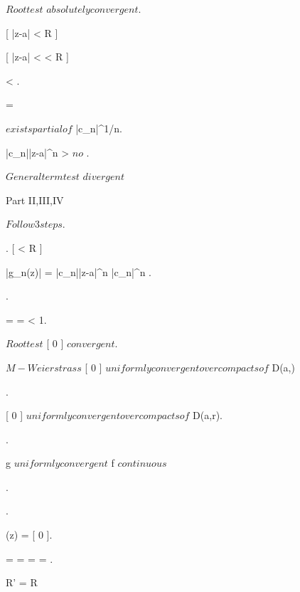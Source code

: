 \documentclass[../Main/main]{subfiles}
\begin{document}
{{{{			 	$ Root test $ \imp $ absolutely convergent $.

			 }

			 [ |z-a| < R ]
			 {
			 	\all{ \rho \in \R }[ |z-a| < \rho < R ]
			 	{
			 		 < .

			 		 =  \imp

			 		$ exists partial of $ |c_n|^{1/n}.

			 		|c_n||z-a|^n >  $ no $ .

			 		$ General term test $ \imp $ divergent $
			 	}
			}
		}
		
	}


	{
		{
			
		}
		\holds
		{
			Part II,III,IV
		}
		\demonstration
		{
			$ Follow 3 steps $.
			
			{
				.
				\all{ \rho \in \R }[ \rho < R ]
				{
					\all{ z \in \closed{D(a,\rho)} }
					{
						|g_n(z)| = |c_n||z-a|^n \leq |c_n|\rho^n
					}.

					.

					 = \rho {} =  < 1.

					$Root test$ \imp {}[ 0 ] $ convergent $.

					$M-Weierstrass$ \imp {}[ 0 ] $ uniformly convergent over compacts of $ D(a,\rho)
				}.

				[ 0 ] $ uniformly convergent over compacts of $ D(a,r).

				.

				g $ uniformly convergent $ \imp f $ continuous $
			}.
			
			{
				.

				(z) = [ 0 ].

				 =  =  =  = .

				R' = R

}}}}
\end{document}
